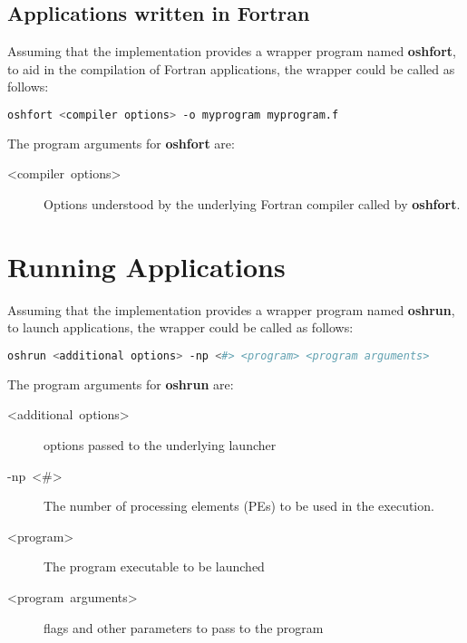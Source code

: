\subsection{Applications written in Fortran}

Assuming that the implementation provides a wrapper program named
\textbf{oshfort}, to aid in the compilation of Fortran applications,
the wrapper could be called as follows:

\begin{lstlisting}[language=bash]
oshfort <compiler options> -o myprogram myprogram.f
\end{lstlisting}


The program arguments for \textbf{oshfort} are:
\begin{description}
\item [{<compiler\ options>}] Options understood by the underlying Fortran
compiler called by \textbf{oshfort}.
\end{description}

\section{Running Applications}

Assuming that the implementation provides a wrapper program named
\textbf{oshrun}, to launch \openshmem applications, the wrapper could
be called as follows:

\begin{lstlisting}[language=bash]
oshrun <additional options> -np <#> <program> <program arguments>
\end{lstlisting}


The program arguments for \textbf{oshrun} are:
\begin{description}
\item [{<additional\ options>}] options passed to the underlying launcher
\item [{-np~<\#>}] The number of processing elements (PEs) to be used
in the execution.
\item [{<program>}] The program executable to be launched
\item [{<program\ arguments>}] flags and other parameters to pass to the program
\end{description}

